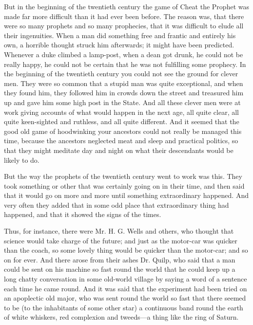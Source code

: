 \documentclass{book}
\begin{document}
But in the beginning of the twentieth century the game of Cheat the Prophet was made far more difficult than it had ever been before. The reason was, that there were so many prophets and so many prophecies, that it was difficult to elude all their ingenuities. When a man did something free and frantic and entirely his own, a horrible thought struck him afterwards; it might have been predicted. Whenever a duke climbed a lamp-post, when a dean got drunk, he could not be really happy, he could not be certain that he was not fulfilling some prophecy. In the beginning of the twentieth century you could not see the ground for clever men. They were so common that a stupid man was quite exceptional, and when they found him, they followed him in crowds down the street and treasured him up and gave him some high post in the State. And all these clever men were at work giving accounts of what would happen in the next age, all quite clear, all quite keen-sighted and ruthless, and all quite different. And it seemed that the good old game of hoodwinking your ancestors could not really be managed this time, because the ancestors neglected meat and sleep and practical politics, so that they might meditate day and night on what their descendants would be likely to do.

But the way the prophets of the twentieth century went to work was this. They took something or other that was certainly going on in their time, and then said that it would go on more and more until something extraordinary happened. And very often they added that in some odd place that extraordinary thing had happened, and that it showed the signs of the times.

Thus, for instance, there were Mr. H. G. Wells and others, who thought that science would take charge of the future; and just as the motor-car was quicker than the coach, so some lovely thing would be quicker than the motor-car; and so on for ever. And there arose from their ashes Dr. Quilp, who said that a man could be sent on his machine so fast round the world that he could keep up a long chatty conversation in some old-world village by saying a word of a sentence each time he came round. And it was said that the experiment had been tried on an apoplectic old major, who was sent round the world so fast that there seemed to be (to the inhabitants of some other star) a continuous band round the earth of white whiskers, red complexion and tweeds—a thing like the ring of Saturn.
\end{document}
